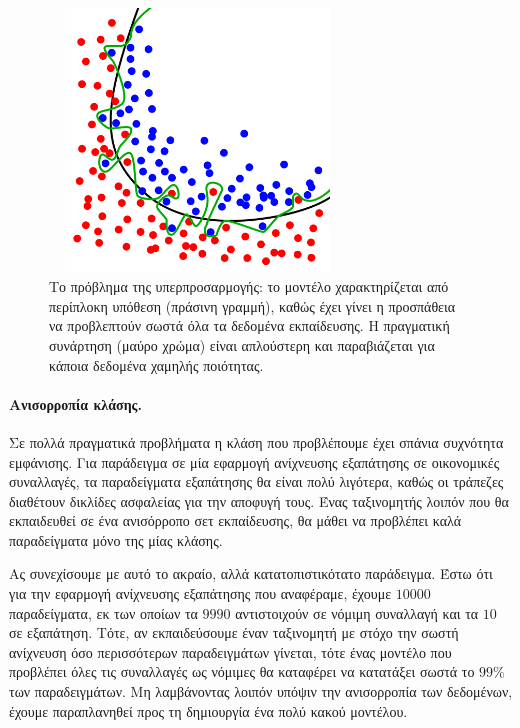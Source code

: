 \documentclass{article}
\begin{document}
 \begin{figure}[H]
	\centering			
    \includegraphics[width=0.7\textwidth, height=7cm]{overfit.png}
    \caption[Το πρόβλημα της υπερπροσαρμογής]{Το πρόβλημα της υπερπροσαρμογής: το μοντέλο χαρακτηρίζεται από περίπλοκη υπόθεση (πράσινη γραμμή), καθώς έχει γίνει η προσπάθεια να προβλεπτούν σωστά όλα τα δεδομένα εκπαίδευσης. Η πραγματική συνάρτηση (μαύρο χρώμα) είναι απλούστερη και παραβιάζεται για κάποια δεδομένα χαμηλής ποιότητας.}
 \end{figure}

\paragraph{Ανισορροπία κλάσης.} Σε πολλά πραγματικά προβλήματα η κλάση που προβλέπουμε έχει σπάνια συχνότητα εμφάνισης. Για παράδειγμα σε μία εφαρμογή ανίχνευσης εξαπάτησης σε οικονομικές συναλλαγές, τα παραδείγματα εξαπάτησης θα είναι πολύ λιγότερα, καθώς οι τράπεζες διαθέτουν δικλίδες ασφαλείας για την αποφυγή τους. Ένας ταξινομητής λοιπόν που θα εκπαιδευθεί σε ένα ανισόρροπο σετ
εκπαίδευσης, θα μάθει να προβλέπει καλά παραδείγματα μόνο της μίας κλάσης.

Ας συνεχίσουμε με αυτό το ακραίο, αλλά κατατοπιστικότατο παράδειγμα. Έστω ότι για την εφαρμογή ανίχνευσης εξαπάτησης που αναφέραμε, έχουμε $10000$ παραδείγματα, εκ των οποίων τα $9990$ αντιστοιχούν σε νόμιμη συναλλαγή και τα $10$ σε εξαπάτηση. Τότε, αν εκπαιδεύσουμε έναν ταξινομητή με στόχο την σωστή ανίχνευση όσο περισσότερων παραδειγμάτων γίνεται, τότε ένας μοντέλο που προβλέπει
όλες τις συναλλαγές ως νόμιμες θα καταφέρει να κατατάξει σωστά το $ 99 \%$ των παραδειγμάτων. Μη λαμβάνοντας λοιπόν υπόψιν την ανισορροπία των δεδομένων, έχουμε παραπλανηθεί προς τη δημιουργία ένα πολύ κακού μοντέλου.
\end{document}
